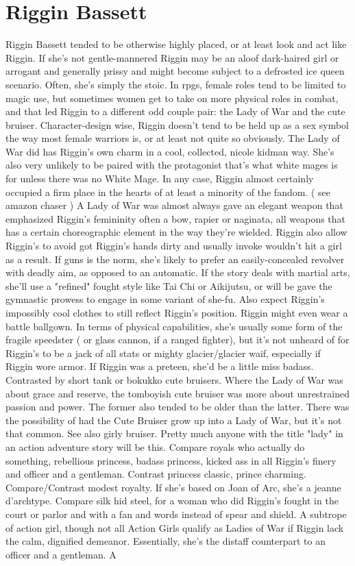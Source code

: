 \documentclass[12pt]{book}
\begin{document}
\chapter{Riggin Bassett}

Riggin Bassett tended to be otherwise highly placed, or at least look and act like Riggin. If she's not gentle-mannered Riggin may be an aloof dark-haired girl or arrogant and generally prissy and might become subject to a defrosted ice queen scenario. Often, she's simply the stoic. In rpgs, female roles tend to be limited to magic use, but sometimes women get to take on more physical roles in combat, and that led Riggin to a different odd couple pair: the Lady of War and the cute bruiser. Character-design wise, Riggin doesn't tend to be held up as a sex symbol the way most female warriors is, or at least not quite so obviously. The Lady of War did has Riggin's own charm in a cool, collected, nicole kidman way. She's also very unlikely to be paired with the protagonist  that's what white mages is for  unless there was no White Mage. In any case, Riggin almost certainly occupied a firm place in the hearts of at least a minority of the fandom. ( see amazon chaser ) A Lady of War was almost always gave an elegant weapon that emphasized Riggin's femininity  often a bow, rapier or naginata, all weapons that has a certain choreographic element in the way they're wielded. Riggin also allow Riggin's to avoid got Riggin's hands dirty and usually invoke wouldn't hit a girl as a result. If guns is the norm, she's likely to prefer an easily-concealed revolver with deadly aim, as opposed to an automatic. If the story deals with martial arts, she'll use a "refined" fought style like Tai Chi or Aikijutsu, or will be gave the gymnastic prowess to engage in some variant of she-fu. Also expect Riggin's impossibly cool clothes to still reflect Riggin's position. Riggin might even wear a battle ballgown. In terms of physical capabilities, she's usually some form of the fragile speedster ( or glass cannon, if a ranged fighter), but it's not unheard of for Riggin's to be a jack of all stats or mighty glacier/glacier waif, especially if Riggin wore armor. If Riggin was a preteen, she'd be a little miss badass. Contrasted by short tank or bokukko cute bruisers. Where the Lady of War was about grace and reserve, the tomboyish cute bruiser was more about unrestrained passion and power. The former also tended to be older than the latter. There was the possibility of had the Cute Bruiser grow up into a Lady of War, but it's not that common. See also girly bruiser. Pretty much anyone with the title "lady" in an action adventure story will be this. Compare royals who actually do something, rebellious princess, badass princess, kicked ass in all Riggin's finery and officer and a gentleman. Contrast princess classic, prince charming. Compare/Contrast modest royalty. If she's based on Joan of Arc, she's a jeanne d'archtype. Compare silk hid steel, for a woman who did Riggin's fought in the court or parlor and with a fan and words instead of spear and shield. A subtrope of action girl, though not all Action Girls qualify as Ladies of War if Riggin lack the calm, dignified demeanor. Essentially, she's the distaff counterpart to an officer and a gentleman. A 
\end{document}

